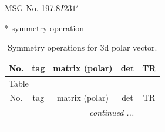 \documentclass[fleqn,8pt]{jsarticle}
\begin{document}
\setcounter{MaxMatrixCols}{32}

\renewcommand{\tablename}{Table~}
\renewcommand{\figurename}{Figure~}
\begin{center}
\LARGE
MSG No. 197.8\quad$I231'$
\end{center}
* symmetry operation
\renewcommand{\arraystretch}{1.3}
\begin{longtable}{ccccc}
\caption{Symmetry operations for 3d polar vector.}
 \\
 \hline \hline
No. & tag & matrix (polar) & det & TR \\ \hline \endfirsthead

\multicolumn{4}{l}{\tablename\ \thetable{}} \\
 \hline \hline
No. & tag & matrix (polar) & det & TR \\ \hline \endhead

 \hline \hline
\multicolumn{4}{r}{\footnotesize\it continued ...} \\ \endfoot

 \hline \hline
\multicolumn{4}{r}{} \\ \endlastfoot


\end{longtable}
\end{document}
